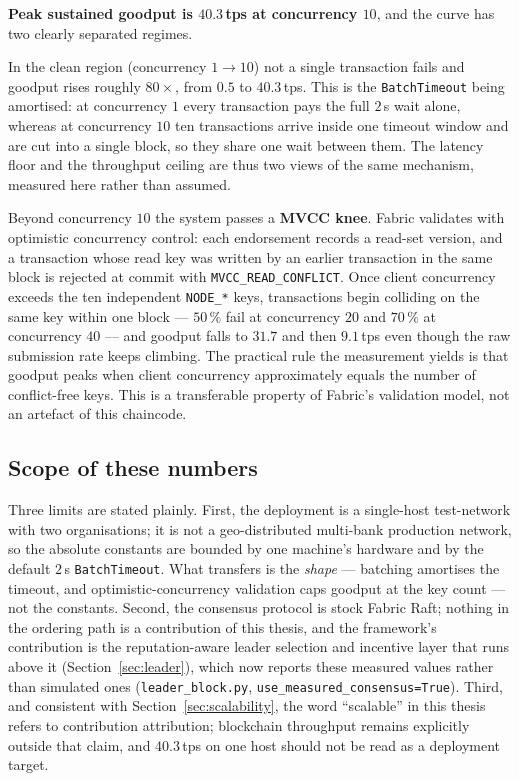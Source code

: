 \textbf{Peak sustained goodput is $40.3$\,tps at concurrency $10$}, and the curve has two clearly separated regimes.

In the clean region (concurrency $1 \to 10$) not a single transaction fails and goodput rises roughly $80\times$, from $0.5$ to $40.3$\,tps. This is the \texttt{BatchTimeout} being amortised: at concurrency $1$ every transaction pays the full $2$\,s wait alone, whereas at concurrency $10$ ten transactions arrive inside one timeout window and are cut into a single block, so they share one wait between them. The latency floor and the throughput ceiling are thus two views of the same mechanism, measured here rather than assumed.

Beyond concurrency $10$ the system passes a \textbf{MVCC knee}. Fabric validates with optimistic concurrency control: each endorsement records a read-set version, and a transaction whose read key was written by an earlier transaction in the same block is rejected at commit with \texttt{MVCC\_READ\_CONFLICT}. Once client concurrency exceeds the ten independent \texttt{NODE\_*} keys, transactions begin colliding on the same key within one block --- $50\,\%$ fail at concurrency $20$ and $70\,\%$ at concurrency $40$ --- and goodput falls to $31.7$ and then $9.1$\,tps even though the raw submission rate keeps climbing. The practical rule the measurement yields is that goodput peaks when client concurrency approximately equals the number of conflict-free keys. This is a transferable property of Fabric's validation model, not an artefact of this chaincode.

\subsection*{Scope of these numbers}

Three limits are stated plainly. First, the deployment is a single-host test-network with two organisations; it is not a geo-distributed multi-bank production network, so the absolute constants are bounded by one machine's hardware and by the default $2$\,s \texttt{BatchTimeout}. What transfers is the \emph{shape} --- batching amortises the timeout, and optimistic-concurrency validation caps goodput at the key count --- not the constants. Second, the consensus protocol is stock Fabric Raft; nothing in the ordering path is a contribution of this thesis, and the framework's contribution is the reputation-aware leader selection and incentive layer that runs above it (Section~\ref{sec:leader}), which now reports these measured values rather than simulated ones (\texttt{leader\_block.py}, \texttt{use\_measured\_consensus=True}). Third, and consistent with Section~\ref{sec:scalability}, the word ``scalable'' in this thesis refers to contribution attribution; blockchain throughput remains explicitly outside that claim, and $40.3$\,tps on one host should not be read as a deployment target.

